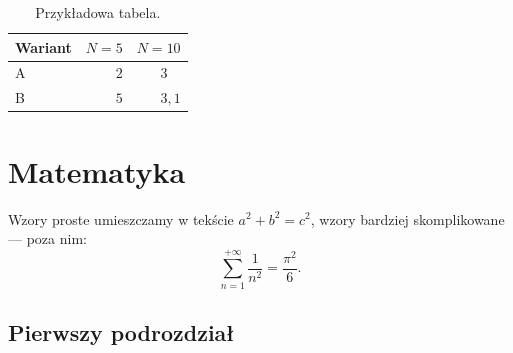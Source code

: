 \documentclass[12pt,a4paper,twoside,openany]{book}
\begin{document}
\begin{table}[h]
\centering
\caption{Przykładowa tabela.}
\label{tab:przyklad}
\footnotesize
\begin{tabular}{|l|r|r|}
\hline
Wariant & $N=5$ & $N=10$\\
\hline
A & $2$ & $3\phantom{{,}1}$ \\
B & $5$ & $3{,}1$ \\

\hline
\end{tabular} 
\end{table}

\clearpage

\chapter{Matematyka}

Wzory proste umieszczamy w tekście $a^2+b^2=c^2$, wzory bardziej skomplikowane --- poza nim:
\begin{equation}
\sum_{n=1}^{+\infty}\frac{1}{n^2}=\frac{\pi^2}{6}.
\end{equation}

\section{Pierwszy podrozdział}
\end{document}
